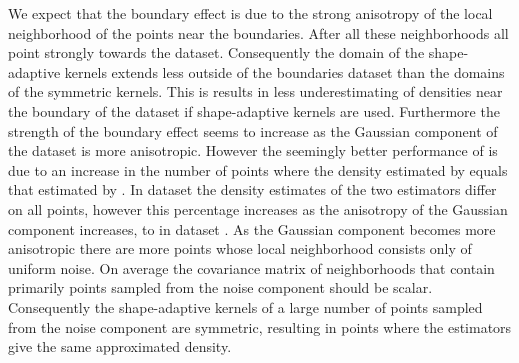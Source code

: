 		We expect that the boundary effect is due to the strong anisotropy of the local neighborhood of the points near the boundaries. After all these neighborhoods all point strongly towards the dataset. Consequently the domain of the shape-adaptive kernels extends less outside of the boundaries dataset than the domains of the symmetric kernels. This is results in less underestimating of densities near the boundary of the dataset if shape-adaptive kernels are used.
		Furthermore the strength of the boundary effect seems to increase as the Gaussian component of the dataset is more anisotropic. However the seemingly better performance of \sambe is due to an increase in the number of points where the density estimated by \sambe equals that estimated by \mbe. In dataset \ferdosiOne the density estimates of the two estimators differ on all points, however this percentage increases as the anisotropy of the Gaussian component increases, to  in dataset \baakmanFive. 
		As the Gaussian component becomes more anisotropic there are more points whose local neighborhood consists only of uniform noise. On average the covariance matrix of neighborhoods that contain primarily points sampled from the noise component should be scalar. Consequently the shape-adaptive kernels of a large number of points sampled from the noise component are symmetric, resulting in points where the estimators give the same approximated density.
	
